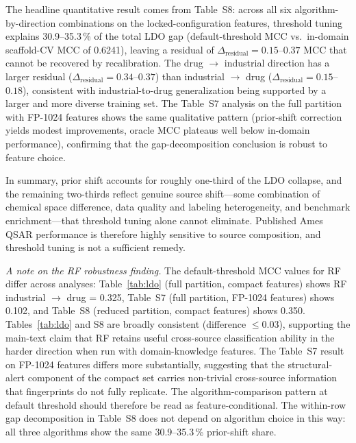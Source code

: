 The headline quantitative result comes from Table~S8: across all six 
algorithm-by-direction combinations on the locked-configuration features, threshold tuning 
explains 30.9--35.3\,\% of the total LDO gap (default-threshold MCC vs.\ in-domain scaffold-CV 
MCC of 0.6241), leaving a residual of $\Delta_{\mathrm{residual}} = 0.15$--$0.37$ MCC that 
cannot be recovered by recalibration. The drug $\to$ industrial direction has a larger 
residual ($\Delta_{\mathrm{residual}} = 0.34$--$0.37$) than industrial $\to$ drug 
($\Delta_{\mathrm{residual}} = 0.15$--$0.18$), consistent with industrial-to-drug 
generalization being supported by a larger and more diverse training set. The Table~S7 
analysis on the full partition with FP-1024 features shows the same qualitative pattern 
(prior-shift correction yields modest improvements, oracle MCC plateaus well below in-domain 
performance), confirming that the gap-decomposition conclusion is robust to feature choice.

In summary, prior shift accounts for roughly one-third of the LDO collapse, and the 
remaining two-thirds reflect genuine source shift---some combination of chemical space 
difference, data quality and labeling heterogeneity, and benchmark enrichment---that 
threshold tuning alone cannot eliminate. Published Ames QSAR performance is therefore highly 
sensitive to source composition, and threshold tuning is not a sufficient remedy.

\textit{A note on the RF robustness finding.} The default-threshold MCC values for RF 
differ across analyses: Table~\ref{tab:ldo} (full partition, compact features) shows RF 
industrial $\to$ drug = 0.325, Table~S7 (full partition, FP-1024 features) shows 0.102, and 
Table~S8 (reduced partition, compact features) shows 0.350. Tables~\ref{tab:ldo} and S8 are 
broadly consistent (difference $\leq 0.03$), supporting the main-text claim that RF retains 
useful cross-source classification ability in the harder direction when run with 
domain-knowledge features. The Table~S7 result on FP-1024 features differs more 
substantially, suggesting that the structural-alert component of the compact set carries 
non-trivial cross-source information that fingerprints do not fully replicate. The 
algorithm-comparison pattern at default threshold should therefore be read as 
feature-conditional. The within-row gap decomposition in Table~S8 does not depend on 
algorithm choice in this way: all three algorithms show the same 30.9--35.3\,\% prior-shift 
share.


